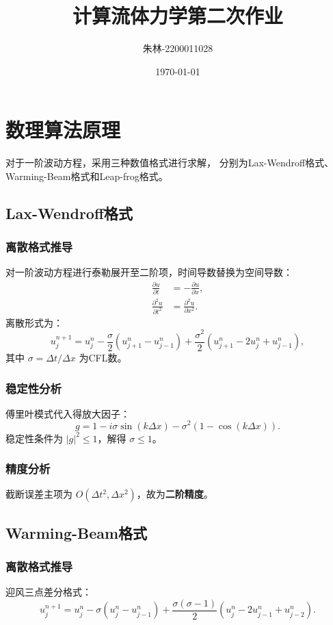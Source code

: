 \documentclass[UTF8]{ctexart}
\begin{document}
\title{计算流体力学第二次作业}
\author{朱林-2200011028}
\date{\today}
\maketitle

\section{数理算法原理}
对于一阶波动方程，采用三种数值格式进行求解，
分别为Lax-Wendroff格式、Warming-Beam格式和Leap-frog格式。
\subsection{Lax-Wendroff格式}
\subsubsection{离散格式推导}
对一阶波动方程进行泰勒展开至二阶项，时间导数替换为空间导数：
\begin{align}
\frac{\partial u}{\partial t} &= -\frac{\partial u}{\partial x}, \\
\frac{\partial^2 u}{\partial t^2} &= \frac{\partial^2 u}{\partial x^2}.
\end{align}
离散形式为：
\begin{equation}
u_j^{n+1} = u_j^n - \frac{\sigma}{2}(u_{j+1}^n - u_{j-1}^n) + \frac{\sigma^2}{2}(u_{j+1}^n - 2u_j^n + u_{j-1}^n),
\end{equation}
其中 $\sigma = \Delta t / \Delta x$ 为CFL数。

\subsubsection{稳定性分析}
傅里叶模式代入得放大因子：
\begin{equation}
g = 1 - i\sigma \sin(k\Delta x) - \sigma^2(1 - \cos(k\Delta x)).
\end{equation}
稳定性条件为 $|g|^2 \leq 1$，解得 $\sigma \leq 1$。

\subsubsection{精度分析}
截断误差主项为 $O(\Delta t^2, \Delta x^2)$，故为\textbf{二阶精度}。

\subsection{Warming-Beam格式}
\subsubsection{离散格式推导}
迎风三点差分格式：
\begin{equation}
u_j^{n+1} = u_j^n - \sigma(u_j^n - u_{j-1}^n) + \frac{\sigma(\sigma-1)}{2}(u_j^n - 2u_{j-1}^n + u_{j-2}^n).
\end{equation}
\end{document}
